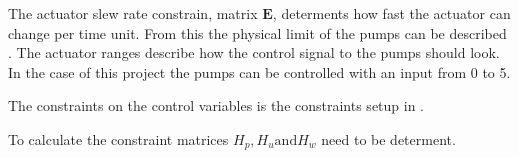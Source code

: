 The actuator slew rate constrain, matrix $\pmb{E}$, determents how fast the actuator can change per time unit. From this the physical limit of the pumps can be described . The actuator ranges describe how the control signal to the pumps should look. In the case of this project the pumps can be controlled with an input from 0 to 5. 

The constraints on the control variables is the constraints setup in . 

To calculate the constraint matrices $H_p, H_u \text{and} H_w$ need to be determent. 